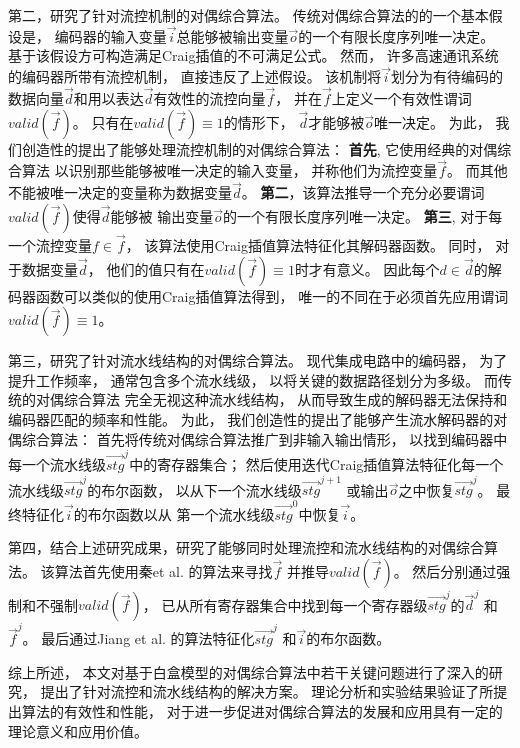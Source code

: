 \begin{cabstract}
第二，研究了针对流控机制的对偶综合算法。
传统对偶综合算法的的一个基本假设是，
编码器的输入变量$\vec{i}$总能够被输出变量$\vec{o}$的一个有限长度序列唯一决定。
基于该假设方可构造满足Craig插值的不可满足公式。
然而，
许多高速通讯系统的编码器所带有流控机制，
直接违反了上述假设。
该机制将$\vec{i}$划分为有待编码的数据向量$\vec{d}$和用以表达$\vec{d}$有效性的流控向量$\vec{f}$，
并在$\vec{f}$上定义一个有效性谓词$valid(\vec{f})$。
只有在$valid(\vec{f})\equiv 1$的情形下，
$\vec{d}$才能够被$\vec{o}$唯一决定。
为此，
我们创造性的提出了能够处理流控机制的对偶综合算法：
\textbf{首先},
它使用经典的对偶综合算法
以识别那些能够被唯一决定的输入变量，
并称他们为流控变量$\vec{f}$。
而其他不能被唯一决定的变量称为数据变量$\vec{d}$。
\textbf{第二}，该算法推导一个充分必要谓词$valid(\vec{f})$使得$\vec{d}$能够被
输出变量$\vec{o}$的一个有限长度序列唯一决定。
\textbf{第三},
对于每一个流控变量$f\in\vec{f}$，
该算法使用Craig插值算法特征化其解码器函数。
同时，
对于数据变量$\vec{d}$，
他们的值只有在$valid(\vec{f}) \equiv 1$时才有意义。
因此每个$d\in\vec{d}$的解码器函数可以类似的使用Craig插值算法得到，
唯一的不同在于必须首先应用谓词$valid(\vec{f}) \equiv 1$。



第三，研究了针对流水线结构的对偶综合算法。
现代集成电路中的编码器，
为了提升工作频率，
通常包含多个流水线级，
以将关键的数据路径划分为多级。
而传统的对偶综合算法
完全无视这种流水线结构，
从而导致生成的解码器无法保持和编码器匹配的频率和性能。
为此，
我们创造性的提出了能够产生流水解码器的对偶综合算法：
首先将传统对偶综合算法推广到非输入输出情形，
以找到编码器中每一个流水线级$\vec{stg}^j$中的寄存器集合；
然后使用迭代Craig插值算法特征化每一个流水线级$\vec{stg}^j$的布尔函数，
以从下一个流水线级$\vec{stg}^{j+1}$ 或输出$\vec{o}$之中恢复$\vec{stg}^j$。
最终特征化$\vec{i}$的布尔函数以从
第一个流水线级$\vec{stg}^0$中恢复$\vec{i}$。

第四，结合上述研究成果，研究了能够同时处理流控和流水线结构的对偶综合算法。
该算法首先使用秦et al. 的算法来寻找$\vec{f}$ 并推导$valid(\vec{f})$。
然后分别通过强制和不强制$valid(\vec{f})$，
已从所有寄存器集合中找到每一个寄存器级$\vec{stg}^j$的$\vec{d}^j$ 和$\vec{f}^j$。
最后通过Jiang et al. 的算法特征化$\vec{stg}^j$ 和$\vec{i}$的布尔函数。

综上所述，
本文对基于白盒模型的对偶综合算法中若干关键问题进行了深入的研究，
提出了针对流控和流水线结构的解决方案。
理论分析和实验结果验证了所提出算法的有效性和性能，
对于进一步促进对偶综合算法的发展和应用具有一定的理论意义和应用价值。
\end{cabstract}

